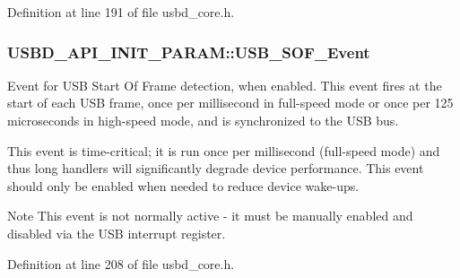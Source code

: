 Definition at line 191 of file usbd\+\_\+core.\+h.

\subsubsection[{\texorpdfstring{U\+S\+B\+\_\+\+S\+O\+F\+\_\+\+Event}{USB_SOF_Event}}]{ U\+S\+B\+D\+\_\+\+A\+P\+I\+\_\+\+I\+N\+I\+T\+\_\+\+P\+A\+R\+A\+M\+::\+U\+S\+B\+\_\+\+S\+O\+F\+\_\+\+Event}\hypertarget{structUSBD__API__INIT__PARAM_af6f224a6b2ddee3c5b2056a62fa84914}{}\label{structUSBD__API__INIT__PARAM_af6f224a6b2ddee3c5b2056a62fa84914}
Event for U\+SB Start Of Frame detection, when enabled. This event fires at the start of each U\+SB frame, once per millisecond in full-\/speed mode or once per 125 microseconds in high-\/speed mode, and is synchronized to the U\+SB bus.

This event is time-\/critical; it is run once per millisecond (full-\/speed mode) and thus long handlers will significantly degrade device performance. This event should only be enabled when needed to reduce device wake-\/ups.

\begin{DoxyNote}{Note}
This event is not normally active -\/ it must be manually enabled and disabled via the U\+SB interrupt register. ~\newline
~\newline

\end{DoxyNote}


Definition at line 208 of file usbd\+\_\+core.\+h.

